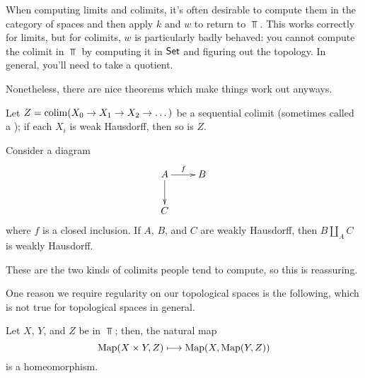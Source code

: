 When computing limits and colimits, it's often desirable to compute them in the category of spaces and then apply
$k$ and $w$ to return to $\Top$. This works correctly for limits, but for colimits, $w$ is particularly badly
behaved: you cannot compute the colimit in $\Top$ by computing it in $\mathsf{Set}$ and figuring out the topology. In
general, you'll need to take a quotient.

Nonetheless, there are nice theorems which make things work out anyways.
\begin{prop}
Let $Z = \operatorname*{colim}(X_0\to X_1\to X_2\to\dots)$ be a sequential colimit (sometimes called a ); if each
$X_i$ is weak Hausdorff, then so is $Z$.
\end{prop}
\begin{prop}
Consider a diagram
\[\xymatrix{
	A\ar[r]^f\ar[d] &B\\
	C
}\]
where $f$ is a closed inclusion. If $A$, $B$, and $C$ are weakly Hausdorff, then $B\amalg_A C$ is weakly Hausdorff.
\end{prop}
These are the two kinds of colimits people tend to compute, so this is reassuring.

One reason we require regularity on our topological spaces is the following, which is not true for topological
spaces in general.
\begin{lem}
Let $X$, $Y$, and $Z$ be in $\Top$; then, the natural map
\[\operatorname{Map}(X\times Y, Z)\longmapsto\operatorname{Map}(X, \operatorname{Map}(Y, Z))\]
is a homeomorphism.
\end{lem}
